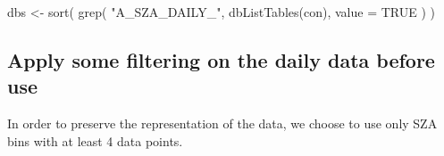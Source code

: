 \documentclass[
  10pt,
  a4paper,oneside]{article}
\newenvironment{Shaded}{\begin{snugshade}}{\end{snugshade}}
\newcommand{\AttributeTok}[1]{\textcolor[rgb]{0.77,0.63,0.00}{#1}}
\newcommand{\ConstantTok}[1]{\textcolor[rgb]{0.00,0.00,0.00}{#1}}
\newcommand{\FunctionTok}[1]{\textcolor[rgb]{0.00,0.00,0.00}{#1}}
\newcommand{\NormalTok}[1]{#1}
\newcommand{\OtherTok}[1]{\textcolor[rgb]{0.56,0.35,0.01}{#1}}
\newcommand{\StringTok}[1]{\textcolor[rgb]{0.31,0.60,0.02}{#1}}
\begin{document}
\begin{Shaded}
\begin{Highlighting}[]
\NormalTok{dbs }\OtherTok{\textless{}{-}} \FunctionTok{sort}\NormalTok{(}
    \FunctionTok{grep}\NormalTok{(}
        \StringTok{"A\_SZA\_DAILY\_"}\NormalTok{, }\FunctionTok{dbListTables}\NormalTok{(con),}
        \AttributeTok{value =} \ConstantTok{TRUE}
\NormalTok{    )}
\NormalTok{)}
\end{Highlighting}
\end{Shaded}

\FloatBarrier
\newpage

\hypertarget{apply-some-filtering-on-the-daily-data-before-use}{%
\subsection{Apply some filtering on the daily data before use}\label{apply-some-filtering-on-the-daily-data-before-use}}

In order to preserve the representation of the data,
we choose to use only SZA bins with at least 4 data
points.
\end{document}
